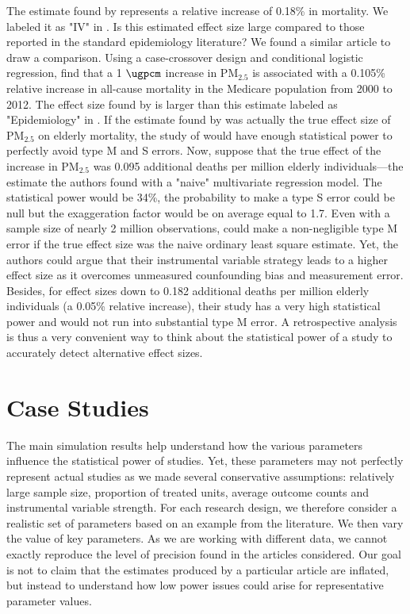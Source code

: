 \documentclass[12pt]{article}
\begin{document}
    The estimate found by \cite{deryugina_mortality_2019} represents a relative increase of 0.18\% in mortality. We labeled it as "IV" in . Is this estimated effect size large compared to those reported in the standard epidemiology literature? We found a similar article to draw a comparison. Using a case-crossover design and conditional logistic regression, \cite{di_association_2017} find that a 1 $\si{\ugpcm}$ increase in PM$_{2.5}$ is associated with a 0.105\% relative increase in all-cause mortality in the Medicare population from 2000 to 2012. The effect size found by \cite{deryugina_mortality_2019} is larger than this estimate labeled as "Epidemiology" in . If the estimate found by \cite{di_association_2017} was actually the true effect size of PM$_{2.5}$ on elderly mortality, the study of \cite{deryugina_mortality_2019} would have enough statistical power to perfectly avoid type M and S errors. Now, suppose that the true effect of the increase in PM$_{2.5}$ was 0.095 additional deaths per million elderly individuals---the estimate the authors found with a "naive" multivariate regression model. The statistical power would be 34\%, the probability to make a type S error could be null but the exaggeration factor would be on average equal to 1.7. Even with a sample size of nearly 2 million observations, \cite{deryugina_mortality_2019} could make a non-negligible type M error if the true effect size was the naive ordinary least square estimate. Yet, the authors could argue that their instrumental variable strategy leads to a higher effect size as it overcomes unmeasured counfounding bias and measurement error. Besides, for effect sizes down to 0.182 additional deaths per million elderly individuals (a 0.05\% relative increase), their study has a very high statistical power and would not run into substantial type M error. A retrospective analysis is thus a very convenient way to think about the statistical power of a study to accurately detect alternative effect sizes.

    \section{Case Studies}  \label{case_studies}

        The main simulation results help understand how the various parameters influence the statistical power of studies. Yet, these parameters may not perfectly represent actual studies as we made several conservative assumptions: relatively large sample size, proportion of treated units, average outcome counts and instrumental variable strength. For each research design, we therefore consider a realistic set of parameters based on an example from the literature. We then vary the value of key parameters. As we are working with different data, we cannot exactly reproduce the level of precision found in the articles considered. Our goal is not to claim that the estimates produced by a particular article are inflated, but instead to understand how low power issues could arise for representative parameter values.
            
\end{document}

